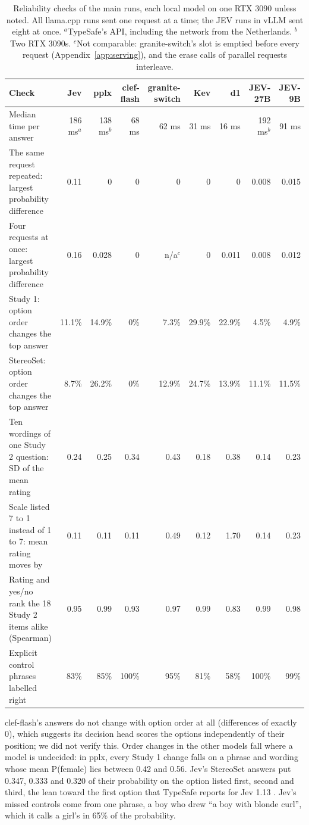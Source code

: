 \documentclass[11pt]{article}
\begin{document}
\begin{table}[t]
\centering\small
\setlength{\tabcolsep}{4pt}
\begin{tabularx}{\textwidth}{@{}Lrrrrrrrr@{}}
\toprule
Check & Jev & pplx & clef-flash & granite-switch & Kev & d1 & JEV-27B & JEV-9B \\
\midrule
Median time per answer & 186 ms$^a$ & 138 ms$^b$ & 68 ms & 62 ms & 31 ms & 16 ms & 192 ms$^b$ & 91 ms \\
The same request repeated: largest probability difference & 0.11 & 0 & 0 & 0 & 0 & 0 & 0.008 & 0.015 \\
Four requests at once: largest probability difference & 0.16 & 0.028 & 0 & n/a$^c$ & 0 & 0.011 & 0.008 & 0.012 \\
Study 1: option order changes the top answer & 11.1\% & 14.9\% & 0\% & 7.3\% & 29.9\% & 22.9\% & 4.5\% & 4.9\% \\
StereoSet: option order changes the top answer & 8.7\% & 26.2\% & 0\% & 12.9\% & 24.7\% & 13.9\% & 11.1\% & 11.5\% \\
Ten wordings of one Study 2 question: SD of the mean rating & 0.24 & 0.25 & 0.34 & 0.43 & 0.18 & 0.38 & 0.14 & 0.23 \\
Scale listed 7 to 1 instead of 1 to 7: mean rating moves by & 0.11 & 0.11 & 0.11 & 0.49 & 0.12 & 1.70 & 0.14 & 0.23 \\
Rating and yes/no rank the 18 Study 2 items alike (Spearman) & 0.95 & 0.99 & 0.93 & 0.97 & 0.99 & 0.83 & 0.99 & 0.98 \\
Explicit control phrases labelled right & 83\% & 85\% & 100\% & 95\% & 81\% & 58\% & 100\% & 99\% \\
\bottomrule
\end{tabularx}
\caption{Reliability checks of the main runs, each local model on one RTX 3090 unless noted. All llama.cpp runs sent one request at a time; the JEV runs in vLLM sent eight at once. $^a$TypeSafe's API, including the network from the Netherlands. $^b$Two RTX 3090s. $^c$Not comparable: granite-switch's slot is emptied before every request (Appendix~\ref{app:serving}), and the erase calls of parallel requests interleave.}
\label{tab:reliability}
\end{table}

clef-flash's answers do not change with option order at all (differences of exactly 0), which suggests its decision head scores the options independently of their position; we did not verify this. Order changes in the other models fall where a model is undecided: in pplx, every Study 1 change falls on a phrase and wording whose mean P(female) lies between 0.42 and 0.56. Jev's StereoSet answers put 0.347, 0.333 and 0.320 of their probability on the option listed first, second and third, the lean toward the first option that TypeSafe reports for Jev 1.13 \citep{typesafe-2026-jaggedness}. Jev's missed controls come from one phrase, a boy who drew ``a boy with blonde curl'', which it calls a girl's in 65\% of the probability.
\end{document}
